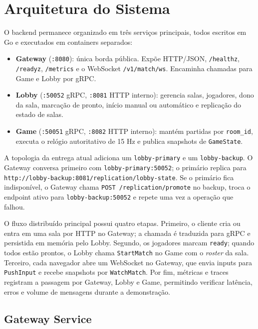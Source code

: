 \documentclass[portuguese]{sbcreviews-2025}%
\begin{document}
\section{Arquitetura do Sistema}

O backend permanece organizado em três serviços principais, todos escritos em Go e executados em containers separados:

\begin{itemize}
\item \textbf{Gateway} (\texttt{:8080}): única borda pública. Expõe HTTP/JSON, \texttt{/healthz}, \texttt{/readyz}, \texttt{/metrics} e o WebSocket \texttt{/v1/match/ws}. Encaminha chamadas para Game e Lobby por gRPC.
\item \textbf{Lobby} (\texttt{:50052} gRPC, \texttt{:8081} HTTP interno): gerencia salas, jogadores, dono da sala, marcação de pronto, início manual ou automático e replicação do estado de salas.
\item \textbf{Game} (\texttt{:50051} gRPC, \texttt{:8082} HTTP interno): mantém partidas por \texttt{room\_id}, executa o relógio autoritativo de 15 Hz e publica snapshots de \texttt{GameState}.
\end{itemize}

A topologia da entrega atual adiciona um \texttt{lobby-primary} e um \texttt{lobby-backup}. O Gateway conversa primeiro com \texttt{lobby-primary:50052}; o primário replica para \texttt{http://lobby-backup:8081/replication/lobby-state}. Se o primário fica indisponível, o Gateway chama \texttt{POST /replication/promote} no backup, troca o endpoint ativo para \texttt{lobby-backup:50052} e repete uma vez a operação que falhou.

O fluxo distribuído principal possui quatro etapas. Primeiro, o cliente cria ou entra em uma sala por HTTP no Gateway; a chamada é traduzida para gRPC e persistida em memória pelo Lobby. Segundo, os jogadores marcam \texttt{ready}; quando todos estão prontos, o Lobby chama \texttt{StartMatch} no Game com o \textit{roster} da sala. Terceiro, cada navegador abre um WebSocket no Gateway, que envia inputs para \texttt{PushInput} e recebe snapshots por \texttt{WatchMatch}. Por fim, métricas e traces registram a passagem por Gateway, Lobby e Game, permitindo verificar latência, erros e volume de mensagens durante a demonstração.

\subsection{Gateway Service}
\end{document}
